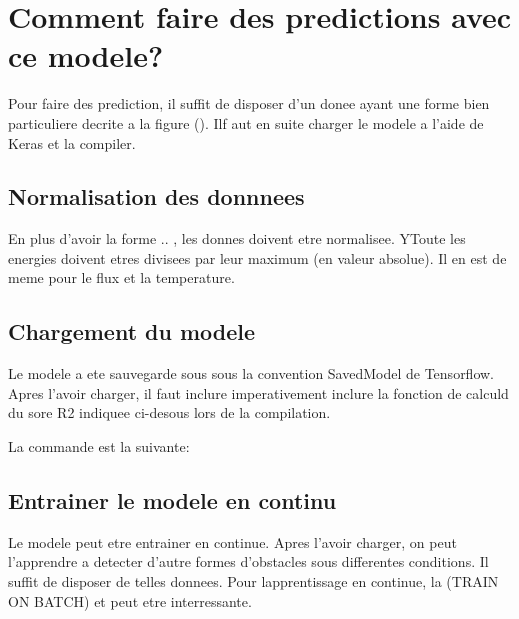 

\chapter{Comment faire des predictions avec ce modele?} %

\label{AppendixB} %
Pour faire des prediction, il suffit de disposer d'un donee ayant une forme bien particuliere decrite a la figure (). Ilf aut en suite charger le modele a l'aide de Keras et la compiler.

\section{Normalisation des donnnees}
En plus d'avoir la forme .. , les donnes doivent etre normalisee. YToute les energies doivent etres divisees par leur maximum (en valeur absolue). Il en est de meme pour le flux et la temperature.

\section{Chargement du modele}
Le modele a ete sauvegarde sous sous la convention SavedModel de Tensorflow. Apres l'avoir charger, il faut inclure imperativement inclure la fonction de calculd du sore R2 indiquee ci-desous lors de la compilation. 

La commande est la suivante:

\section{Entrainer le modele en continu}
Le modele peut etre entrainer en continue. Apres l'avoir charger, on peut l'apprendre a detecter d'autre formes d'obstacles sous differentes conditions. Il suffit de disposer de telles donnees. Pour lapprentissage en continue, la (TRAIN ON BATCH) et peut etre interressante.


